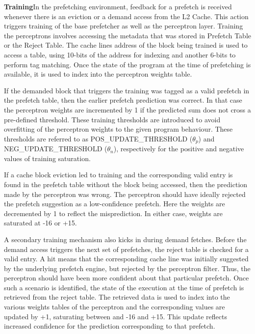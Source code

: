 \textbf{Training}\newline In the prefetching environment, feedback for a
prefetch is received whenever there is an eviction or a demand access from the
L2 Cache.  This action triggers training of the base prefetcher as well as the
perceptron layer.  Training the perceptrons involves accessing
the metadata that was stored in Prefetch Table or the Reject Table. 
The cache lines address of the block being trained is used to access a table,
using 10-bits of the address for indexing and another 6-bits to perform tag matching.
Once the state of the program at the time of prefetching is available, it is 
used to index into the perceptron weights table.

If the demanded block that triggers the training was tagged as a valid
prefetch in the prefetch table, then the earlier prefetch prediction was
correct.  In that case the perceptron weights are incremented by 1
if the predicted sum does not cross a pre-defined threshold. These training 
thresholds are introduced to avoid overfitting of the perceptron weights to the given program 
behaviour. These thresholds are referred to as POS\_UPDATE\_THRESHOLD ($\theta_p$) and 
NEG\_UPDATE\_THRESHOLD ($\theta_n$),  respectively for the positive and 
negative values of training saturation.

If a cache block eviction led to training and the corresponding valid entry is found in the
prefetch table without the block being accessed, then the prediction made by the perceptron was wrong.
The perceptron should have ideally rejected the prefetch suggestion as a
low-confidence prefetch.  Here the weights are decremented by 1 to reflect the
misprediction. In either case, weights are saturated at -16 or +15. %

A secondary training mechanism also kicks in during demand fetches.  Before
the demand access triggers the next set of prefetches, the reject table is
checked for a valid entry.  A hit means that the corresponding cache line was
initially suggested by the underlying prefetch engine, but rejected by the
perceptron filter.  Thus, the perceptron should have been more confident
about that particular prefetch.  Once such a scenario is identified, the state %
of the execution at the time of prefetch is retrieved from the reject table.
The retrieved data is used to index into the various weights tables of the
perceptron and the corresponding values are updated by +1, saturating between
and -16 and +15.  This update reflects increased confidence for the prediction
corresponding to that prefetch.

